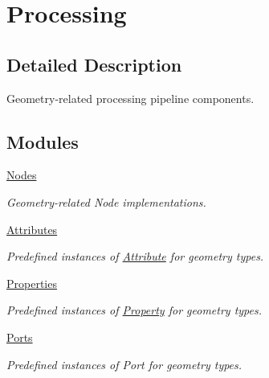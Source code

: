 \hypertarget{group___geometry_process}{}\section{Processing}
\label{group___geometry_process}


\subsection{Detailed Description}
Geometry-\/related processing pipeline components. 

\subsection*{Modules}
\begin{DoxyCompactItemize}
\item 
\hyperlink{group___geometry_nodes}{Nodes}
\begin{DoxyCompactList}\small\item\em Geometry-\/related Node implementations. \end{DoxyCompactList}\item 
\hyperlink{group___geometry_attributes}{Attributes}
\begin{DoxyCompactList}\small\item\em Predefined instances of \hyperlink{classdg_1_1deepcore_1_1_attribute}{Attribute} for geometry types. \end{DoxyCompactList}\item 
\hyperlink{group___geometry_properties}{Properties}
\begin{DoxyCompactList}\small\item\em Predefined instances of \hyperlink{classdg_1_1deepcore_1_1_property}{Property} for geometry types. \end{DoxyCompactList}\item 
\hyperlink{group___geometry_ports}{Ports}
\begin{DoxyCompactList}\small\item\em Predefined instances of Port for geometry types. \end{DoxyCompactList}\end{DoxyCompactItemize}
